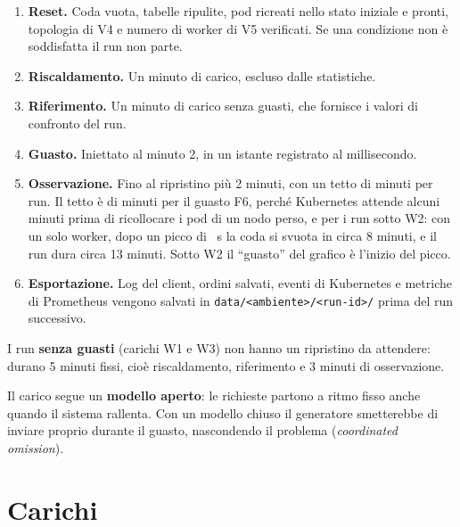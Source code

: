 \begin{enumerate}
  \item \textbf{Reset.} Coda vuota, tabelle ripulite, pod ricreati nello stato iniziale e pronti, topologia di V4 e numero di worker di V5 verificati. Se una condizione non è soddisfatta il run non parte.
  \item \textbf{Riscaldamento.} Un minuto di carico, escluso dalle statistiche.
  \item \textbf{Riferimento.} Un minuto di carico senza guasti, che fornisce i valori di confronto del run.
  \item \textbf{Guasto.} Iniettato al minuto 2, in un istante registrato al millisecondo.
  \item \textbf{Osservazione.} Fino al ripristino più 2 minuti, con un tetto di  minuti per run. Il tetto è di  minuti per il guasto F6, perché Kubernetes attende alcuni minuti prima di ricollocare i pod di un nodo perso, e per i run sotto W2: con un solo worker, dopo un picco di ~s la coda si svuota in circa 8 minuti, e il run dura circa 13 minuti. Sotto W2 il ``guasto'' del grafico è l'inizio del picco.
  \item \textbf{Esportazione.} Log del client, ordini salvati, eventi di Kubernetes e metriche di Prometheus vengono salvati in \texttt{data/<ambiente>/<run-id>/} prima del run successivo.
\end{enumerate}

I run \textbf{senza guasti} (carichi W1 e W3) non hanno un ripristino da attendere: durano 5 minuti fissi, cioè riscaldamento, riferimento e 3 minuti di osservazione.

Il carico segue un \textbf{modello aperto}: le richieste partono a ritmo fisso anche quando il sistema rallenta. Con un modello chiuso il generatore smetterebbe di inviare proprio durante il guasto, nascondendo il problema (\textit{coordinated omission}).

\section{Carichi}

